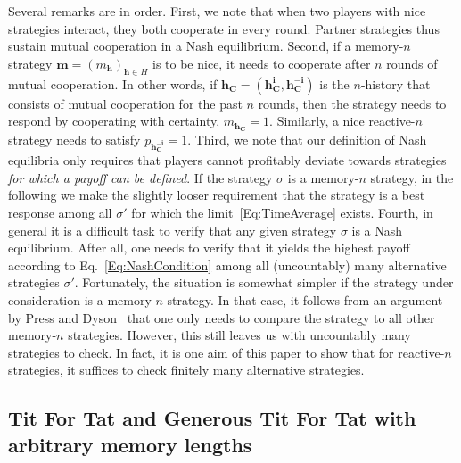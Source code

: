 \documentclass[11pt]{article}
\theoremstyle{plainCl1}
\theoremstyle{plainCl2}
\begin{document}
\noindent
Several remarks are in order. First, we note that when two players with nice strategies interact, they both cooperate in every round. Partner strategies thus sustain mutual cooperation in a Nash equilibrium. 
Second, if a memory-$n$ strategy $\mathbf{m}\!=\!(m_\mathbf{h})_{\mathbf{h}\in H}$ is to be nice, it needs to cooperate after $n$ rounds of mutual cooperation. In other words, if $\mathbf{h_C} \!=\! (\mathbf{h^i_C},\mathbf{h^{-i}_C})$ is the $n$-history that consists of mutual cooperation for the past $n$ rounds, then the strategy needs to respond by cooperating with certainty, $m_\mathbf{h_C}\!=\!1$.  Similarly, a nice reactive-$n$ strategy needs to satisfy $p_\mathbf{h^{-i}_C}\!=\!1$.
Third, we note that our definition of Nash equilibria only requires that players cannot profitably deviate towards strategies {\it for which a payoff can be defined}. If the strategy $\sigma$ is a memory-$n$ strategy, in the following we make the slightly looser requirement that the strategy is a best response among all $\sigma'$ for which the limit~\eqref{Eq:TimeAverage} exists. 
Fourth, in general it is a difficult task to verify that any given strategy $\sigma$ is a Nash equilibrium. 
After all, one needs to verify that it yields the highest payoff according to Eq.~\eqref{Eq:NashCondition} among all (uncountably) many alternative strategies $\sigma'$. 
Fortunately, the situation is somewhat simpler if the strategy under consideration is a memory-$n$ strategy. 
In that case, it follows from an argument by Press and Dyson~\cite{press:PNAS:2012}  that one only needs to compare the strategy to all other memory-$n$ strategies. 
However, this still leaves us with uncountably many strategies to check. 
In fact, it is one aim of this paper to show that for reactive-$n$ strategies, it suffices to check finitely many alternative strategies. 




\subsection{Tit For Tat and Generous Tit For Tat with arbitrary memory lengths}\label{section:tft_and_gtft}
\end{document}
